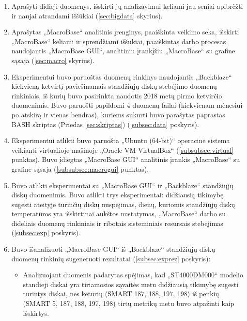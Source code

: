 \documentclass{VUMIFPSkursinis}
\begin{document}
\begin{enumerate}
\item Aprašyti didieji duomenys, išskirti jų analizavimui keliami jau seniai apibrėžti ir naujai atrandami iššūkiai (\ref{sec:bigdata} skyrius).

\item Aprašytas „MacroBase“ analitinis įrenginys, paaiškinta veikimo seka, išskirti „MacroBase“ keliami ir sprendžiami iššūkiai, paaiškintas darbo procesas naudojantis „MacroBase GUI“, analitiniu įrankįžiu „MacroBase“ su grafine sąsaja (\ref{sec:macro} skyrius).

\item Eksperimentui buvo paruoštas duomenų rinkinys naudojantis „Backblaze“ kiekvieną ketvirtį paviešinamais standžiųjų diskų stebėjimo duomenų rinkiniais, iš kurių buvo pasirinkta naudotis 2018 metų pirmo ketvirčio duomenimis. Buvo paruošti papildomi 4 duomenų failai (kiekvienam mėnesiui po atskirą ir vienas bendras), kuriems sukurti buvo parašytas paprastas BASH skriptas (Priedas \ref{sec:skriptas}) (\ref{subsec:data} poskyris).

\item Eksperimentui atlikti buvo paruošta „Ubuntu (64-bit)“ operacinė sistema veikianti virtualioje mašinoje „Oracle VM VirtualBox“ (\ref{subsubsec:virtual} punktas). Buvo įdiegtas „MacroBase GUI“ analitinis įrankis „MacroBase“ su grafine sąsaja (\ref{subsubsec:macrogui} punktas).

\item Buvo atlikti eksperimentai su „MacroBase GUI“ ir „Backblaze“ standžiųjų diskų duomenimis. Buvo atlikti trys eksperimentai: didžiausią tikimybę sugesti ateityje turinčių diskų nuspėjimas, dienų, kuriomis standžiųjų diskų temperatūros yra išskirtinai aukštos nustatymas, „MacroBase“ darbo su dideliais duomenų rinkiniais ir ribotais sisteminiais resursais stebėjimas (\ref{subsec:exp} poskyris).

\item Buvo išanalizuoti „MacroBase GUI“ iš „Backblaze“ standžiųjų diskų duomenų rinkinių sugeneruoti rezultatai (\ref{subsec:exprez} poskyris):

\begin{itemize}
\item Analizuojant duomenis padarytas spėjimas, kad „ST4000DM000“ modelio standieji diskai yra  tiriamosios sąvaitės metu didžiausią tikimybę sugesti turintys diskai, nes keturių (SMART 187, 188, 197, 198) iš penkių (SMART 5, 187, 188, 197, 198) tirtų metrikų metu buvo atpažinti kaip išskirtys.


\end{itemize}
\end{enumerate}
\end{document}
